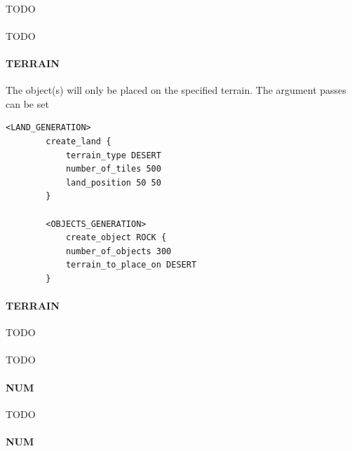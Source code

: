     \paragraph{}

    TODO

    \paragraph{}

    TODO

    \paragraph{ TERRAIN}

    The object(s) will only be placed on the specified terrain. The argument passes can be set 

    \begin{lstlisting}[language={rms}, caption={Example where place decorative rocks on a central desert..}]
        <LAND_GENERATION>
        create_land {
            terrain_type DESERT
            number_of_tiles 500
            land_position 50 50
        }

        <OBJECTS_GENERATION>
            create_object ROCK {
            number_of_objects 300
            terrain_to_place_on DESERT
        }
    \end{lstlisting}

    \paragraph{ TERRAIN}

    TODO

    \paragraph{}

    TODO

    \paragraph{ NUM}

    TODO

    \paragraph{ NUM}

